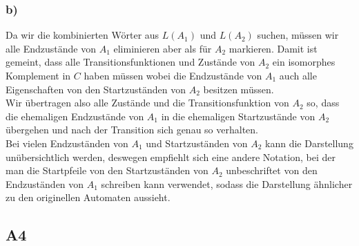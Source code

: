 \documentclass[12pt, a4paper]{article}
\begin{document}
\begin{doublespace}

\subsubsection*{b)}
Da wir die kombinierten Wörter aus \(L(A_1)\) und \(L(A_2)\) suchen, müssen wir alle Endzustände von \(A_1\) eliminieren aber als   für \(A_2\) markieren. Damit ist gemeint, dass alle Transitionsfunktionen und Zustände von \(A_2\) ein isomorphes Komplement in \(C\) haben müssen wobei die Endzustände von \(A_1\) auch alle Eigenschaften von den Startzuständen von \(A_2\) besitzen müssen. \\
Wir übertragen also alle Zustände und die Transitionsfunktion von \(A_2\) so, dass die ehemaligen Endzustände von \(A_1\) in die ehemaligen Startzustände von \(A_2\) übergehen und nach der Transition sich genau so verhalten. \\
Bei vielen Endzuständen von \(A_1\) und Startzuständen von \(A_2\) kann die Darstellung unübersichtlich werden, deswegen empfiehlt sich eine andere Notation, bei der man die Startpfeile von den Startzuständen von \(A_2\) unbeschriftet von den Endzuständen von \(A_1\) schreiben kann verwendet, sodass die Darstellung ähnlicher zu den originellen Automaten aussieht.
\subsection*{A4}

\end{doublespace}
\end{document}
